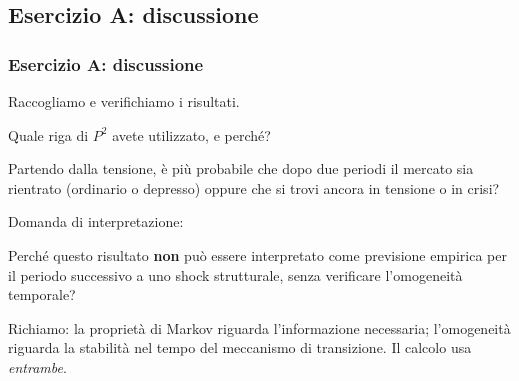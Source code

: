 

\subsection{Esercizio A: discussione}%

\begin{frame}%
%

\frametitle{Esercizio A: discussione}%
%

%


Raccogliamo e verifichiamo i risultati.

\medskip

\begin{stepitemize}


\item Quale riga di $P^{2}$ avete utilizzato, e perch\'{e}?

\item Partendo dalla tensione, \`{e} pi\`{u} probabile che dopo due periodi il
mercato sia rientrato (ordinario o depresso) oppure che si trovi ancora in
tensione o in crisi?
\end{stepitemize}

\medskip

Domanda di interpretazione:

\begin{stepitemize}
\item Perch\'{e} questo risultato \textbf{non} pu\`{o} essere interpretato
come previsione empirica per il periodo successivo a uno shock strutturale,
senza verificare l'omogeneit\`{a} temporale?
\end{stepitemize}

\medskip

\begin{center}
{\small Richiamo: la propriet\`{a} di Markov riguarda l'informazione
necessaria; l'omogeneit\`{a} riguarda la stabilit\`{a} nel tempo del
meccanismo di transizione. Il calcolo usa \emph{entrambe}.}
\end{center}

%

\transboxout
\end{frame}%


